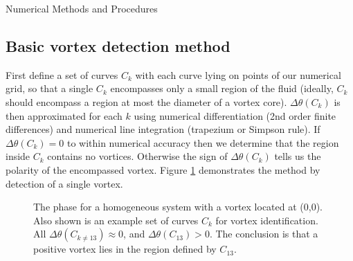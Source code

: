 \begin{chapter}{\label{cha:numerics}Numerical Methods and Procedures}
\subsection{\label{section:vortexloc} Basic vortex detection method}
First define a set of curves $C_k$ with each curve lying on points of our numerical grid, so that a single $C_k$ encompasses only a small region of the fluid (ideally, $C_k$ should encompass a region at most the diameter of a vortex core). $\Delta\theta(C_k)$ is then approximated for each $k$ using numerical differentiation (2nd order finite differences) and numerical line integration (trapezium or Simpson rule). If $\Delta\theta(C_k) = 0$ to within numerical accuracy then we determine that the region inside $C_k$ contains no vortices. Otherwise the sign of $\Delta\theta(C_k)$ tells us the polarity of the encompassed vortex. Figure \ref{fig:vort_detect_simple} demonstrates the method by detection of a single vortex.

\begin{figure}
  \centering
  \caption{\label{fig:vort_detect_simple}The phase for a homogeneous system with a vortex located at (0,0). Also shown is an example set of curves $C_k$ for vortex identification. All $\Delta\theta(C_{k\neq13})\approx0$, and $\Delta\theta(C_{13})>0$. The conclusion is that a positive vortex lies in the region defined by $C_{13}$.}
 \end{figure}


\end{chapter}
